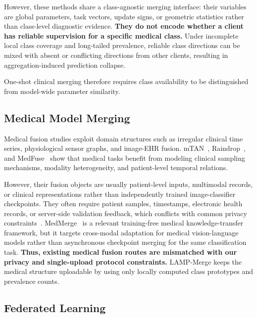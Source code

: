 \documentclass[letterpaper]{article} %
\begin{document}
However, these methods share a class-agnostic merging interface: their variables are global parameters, task vectors, update signs, or geometric statistics rather than class-level diagnostic evidence. \textbf{They do not encode whether a client has reliable supervision for a specific medical class.} Under incomplete local class coverage and long-tailed prevalence, reliable class directions can be mixed with absent or conflicting directions from other clients, resulting in aggregation-induced prediction collapse\cite{BUDA2018249,10.1371/journal.pmed.1002683}.

One-shot clinical merging therefore requires class availability to be distinguished from model-wide parameter similarity.

\subsection{Medical Model Merging}

Medical fusion studies exploit domain structures such as irregular clinical time series, physiological sensor graphs, and image-EHR fusion. mTAN~\cite{shukla2021multitimeattentionnetworksirregularly}, Raindrop~\cite{zhang2022graphguidednetworkirregularlysampled}, and MedFuse~\cite{hayat2023medfusemultimodalfusionclinical} show that medical tasks benefit from modeling clinical sampling mechanisms, modality heterogeneity, and patient-level temporal relations.

However, their fusion objects are usually patient-level inputs, multimodal records, or clinical representations rather than independently trained image-classifier checkpoints. They often require patient samples, timestamps, electronic health records, or server-side validation feedback, which conflicts with common privacy constraints~\cite{kaissis2020secure,sheller2020federated,bonawitz2019towards}. MedMerge~\cite{11382027} is a relevant training-free medical knowledge-transfer framework, but it targets cross-modal adaptation for medical vision-language models rather than asynchronous checkpoint merging for the same classification task. \textbf{Thus, existing medical fusion routes are mismatched with our privacy and single-upload protocol constraints.} LAMP-Merge keeps the medical structure uploadable by using only locally computed class prototypes and prevalence counts.

\subsection{Federated Learning}
\end{document}

